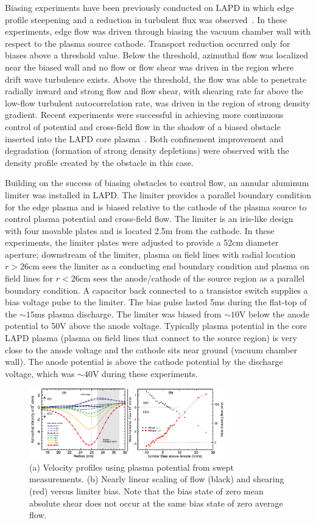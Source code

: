 \documentclass[aps,prl,amsmath,amssymb,preprint,superscriptaddress]{revtex4}
\begin{document}
Biasing experiments have been previously conducted on LAPD in which
edge profile steepening and a reduction in turbulent flux was
observed~\cite{maggs07,carter09}. In these experiments, edge flow was
driven through biasing the vacuum chamber wall with respect to the
plasma source cathode.  Transport reduction occurred only for biases
above a threshold value.  Below the threshold, azimuthal flow was
localized near the biased wall and no flow or flow shear was driven in
the region where drift wave turbulence exists.  Above the threshold,
the flow was able to penetrate radially inward and strong flow and
flow shear, with shearing rate far above the low-flow turbulent
autocorrelation rate, was driven in the region of strong density
gradient.   Recent experiments were successful in achieving more continuous control of potential and cross-field flow in the shadow of a biased obstacle inserted into the LAPD core plasma~\cite{zhou12}.  Both confinement improvement and degradation (formation of strong density depletions) were observed with the density profile created by the obstacle in this case.  

Building on the success of biasing obstacles to control flow, an
annular aluminum limiter was installed in LAPD. The limiter provides a parallel boundary condition for the edge plasma and is biased relative to the cathode of the plasma source to control plasma potential and cross-field flow.  The limiter is
an iris-like design with four movable plates and is located 2.5m from
the cathode.  In these experiments, the limiter plates were adjusted
to provide a 52cm diameter aperture; downstream of the
limiter, plasma on field lines with radial location $r>26$cm sees the
limiter as a conducting end boundary condition and plasma on field
lines for $r<26$cm sees the anode/cathode of the source region as a
parallel boundary condition.  A capacitor back connected to a transistor switch supplies a bias voltage pulse to the limiter.  The
bias pulse lasted 5ms during the flat-top of the $\sim 15$ms plasma
discharge. The limiter was biased from $\sim 10$V below the anode
potential to 50V above the anode voltage.  Typically plasma potential
in the core LAPD plasma (plasma on field lines that connect to the
source region) is very close to the anode voltage and the cathode sits
near ground (vacuum chamber wall).  The anode potential is above the
cathode potential by the discharge voltage, which was $\sim 40$V during these experiments.

\begin{figure}[!htbp]
\centerline{
\includegraphics[width=8.5cm]{velocity_flowshear}}
\caption{\label{fig:velocity_flowshear} (a) Velocity profiles using plasma potential from swept measurements. (b) Nearly linear scaling of flow (black) and shearing (red) versus limiter bias. Note that the bias state of zero mean absolute shear does not occur at the same bias state of zero average flow.}
\end{figure}
\end{document}
